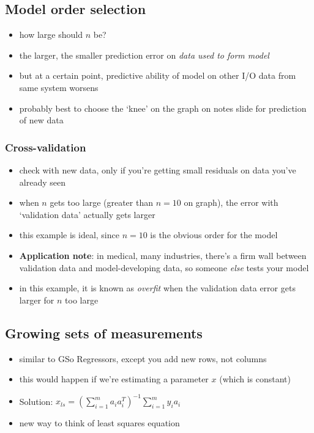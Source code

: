\documentclass[10pt,letterpaper]{article}
\begin{document}
\subsection{Model order selection}
\label{sec-5_4}

\begin{itemize}
\item how large should $n$ be?
\item the larger, the smaller prediction error on \emph{data used to form model}
\item but at a certain point, predictive ability of model on other I/O data from same system worsens
\item probably best to choose the `knee' on the graph on notes slide for prediction of new data
\end{itemize}
\subsubsection{Cross-validation}
\label{sec-5_4_1}

\begin{itemize}
\item check with new data, only if you're getting small residuals on data you've already seen
\item when $n$ gets too large (greater than $n=10$ on graph), the error with `validation data' actually gets larger
\item this example is ideal, since $n=10$ is the obvious order for the model
\item \textbf{Application note}: in medical, many industries, there's a firm wall between validation data and model-developing data, so someone \emph{else} tests your model
\item in this example, it is known as \emph{overfit} when the validation data error gets larger for $n$ too large
\end{itemize}
\subsection{Growing sets of measurements}
\label{sec-5_5}

\begin{itemize}
\item similar to GSo Regressors, except you add new rows, not columns
\item this would happen if we're estimating a parameter $x$ (which is constant)
\item Solution: $\displaystyle x_{ls} = \left( \sum ^{m} _{i=1} a_i a_i ^{T} \right) ^{-1} \sum ^{m} _{i=1} y_i a_i$
\item new way to think of least squares equation
\end{itemize}
\end{document}
